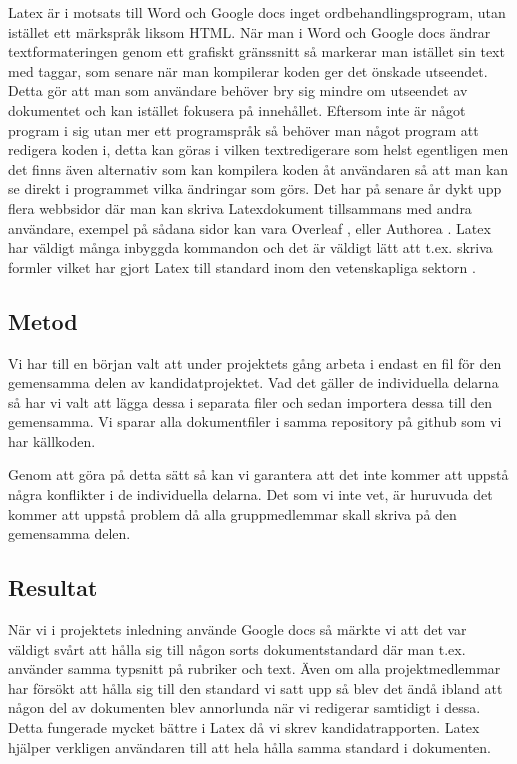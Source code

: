 Latex är i motsats till Word och Google docs inget ordbehandlingsprogram, utan istället ett märkspråk liksom HTML. När man i Word och Google docs 
ändrar textformateringen genom ett grafiskt gränssnitt så markerar man istället sin text med taggar, som senare när man kompilerar koden ger
det önskade utseendet. Detta gör att man som användare behöver bry sig mindre om utseendet av dokumentet och kan istället fokusera på innehållet.
Eftersom inte är något program i sig utan mer ett programspråk så behöver man något program att redigera koden i, detta kan göras i vilken textredigerare som helst egentligen men det finns även alternativ som kan kompilera koden åt användaren så att man kan se direkt i programmet vilka ändringar som görs. Det har på senare år dykt upp flera webbsidor där man kan skriva Latexdokument tillsammans med andra användare, exempel på sådana sidor kan vara Overleaf \cite{overleaf}, eller Authorea \cite{authorea}. Latex har väldigt många inbyggda kommandon och det är väldigt lätt att t.ex. skriva formler vilket har gjort Latex till standard inom den vetenskapliga sektorn \cite{latex_standard}.


\subsection{Metod}
Vi har till en början valt att under projektets gång arbeta i endast en fil för den gemensamma delen av kandidatprojektet. Vad det gäller 
de individuella delarna så har vi valt att lägga dessa i separata filer och sedan importera dessa till den gemensamma. Vi 
sparar alla dokumentfiler i samma repository på github som vi har källkoden.

Genom att göra på detta sätt så kan vi garantera att det inte kommer att uppstå några konflikter i de individuella delarna.
Det som vi inte vet, är huruvuda det kommer att uppstå problem då alla gruppmedlemmar skall skriva på den gemensamma delen.

\subsection{Resultat}
När vi i projektets inledning använde Google docs så märkte vi att det var väldigt svårt att hålla sig till någon sorts dokumentstandard där man t.ex. använder samma typsnitt på rubriker och text. Även om alla projektmedlemmar har försökt att hålla sig till den standard vi satt upp så blev det ändå ibland att någon del av dokumenten blev annorlunda när vi redigerar samtidigt i dessa. Detta fungerade mycket bättre i Latex då vi skrev kandidatrapporten. Latex hjälper verkligen användaren till att hela hålla samma standard i dokumenten.

